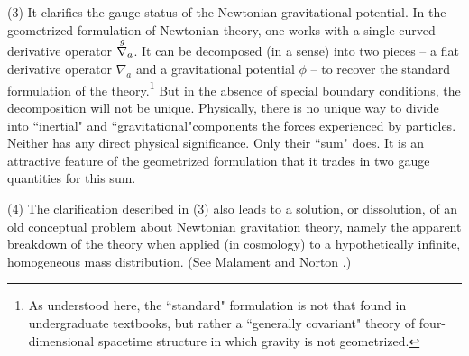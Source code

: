 \documentclass [12] {article}
\theoremstyle{plain}
\numberwithin{figure}{subsection}
\numberwithin{proposition}{subsection}
\begin{document}
(3) It clarifies the gauge status of the Newtonian gravitational potential.  In the geometrized formulation of Newtonian theory,  one works with a single curved derivative operator $\stackrel{g \hspace{.4em}}{\nabla_a}$. It can be decomposed (in a sense) into two pieces -- a flat derivative operator $\nabla_a$ and a gravitational potential $\phi$ -- to recover the standard formulation of the theory.\footnote{As understood here,  the  ``standard" formulation is not that found in undergraduate textbooks, but rather a ``generally covariant"  theory of four-dimensional spacetime structure in which gravity is not geometrized.} But in the absence of special boundary conditions, the decomposition will not be unique.  Physically, there is no unique way to divide into ``inertial" and ``gravitational"components the forces experienced by particles. Neither has any direct physical significance. Only their ``sum" does. It is an attractive feature of  the geometrized formulation that it trades in two gauge quantities for this sum.

(4) The clarification  described in (3) also leads to  a solution, or dissolution, of an old conceptual problem about Newtonian gravitation theory,  namely the apparent breakdown of the theory when applied (in cosmology) to a hypothetically infinite, homogeneous mass distribution. (See Malament  and Norton .) 


\end{document}
